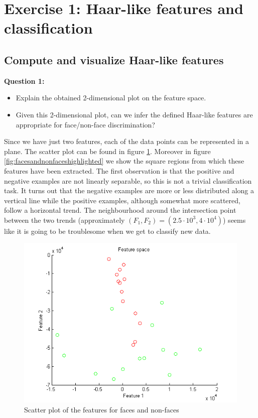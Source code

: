 \section{Exercise 1: Haar-like features and classification}

\subsection{Compute and visualize Haar-like features}

{\noindent\bfseries
Question 1:
\begin{itemize}
\item Explain the obtained 2-dimensional plot on the feature space.
\item Given this 2-dimensional plot, can we infer the defined Haar-like features are appropriate for face/non-face discrimination?
\end{itemize}}


Since we have just two features, each of the data points can be represented in a plane. The scatter plot can be found in figure \ref{fig:featscatter}. Moreover in figure \ref{fig:facesandnonfaceshighlighted} we show the square regions from which these features have been extracted. The first observation is that the positive and negative examples are not linearly separable, so this is not a trivial classification task. It turns out that the negative examples are more or less distributed along a vertical line while the positive examples, although somewhat more scattered, follow a horizontal trend. The neighbourhood around the intersection point between the two trends (approximately $ ( F_1, F_2) = ( 2.5 \cdot 10^3, 4 \cdot 10^4 ) $) seems like it is going to be troublesome when we get to classify new data.

\begin{figure}[h!tb]
	\centering
		\includegraphics[width=0.6 \textwidth]{./img/ex1/featscatter.png}
	\caption{Scatter plot of the features for faces and non-faces}
	\label{fig:featscatter}
\end{figure}

